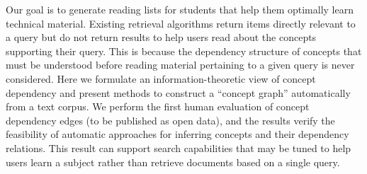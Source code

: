 Our goal is to generate reading lists for students that help them optimally learn technical material. Existing retrieval algorithms return items directly relevant to a query but do not return results to help users read about the concepts supporting their query. This is because the dependency structure of concepts that must be understood before reading material pertaining to a given query is never considered. Here we formulate an information-theoretic view of concept dependency and present methods to construct a ``concept graph'' automatically from a text corpus. We perform the first human evaluation of concept dependency edges (to be published as open data), and the results verify the feasibility of automatic approaches for inferring concepts and their dependency relations. This result can support search capabilities that may be tuned to help users learn a subject rather than retrieve documents based on a single query.
